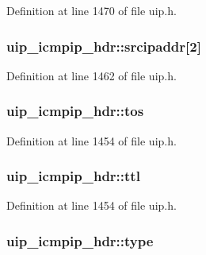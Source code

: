 Definition at line 1470 of file uip.h.

\hypertarget{structuip__icmpip__hdr_a0ec6a6cbcbfd191d393738c16d54e5e1}{
\subsubsection[{srcipaddr}]{ {\bf uip\_\-icmpip\_\-hdr::srcipaddr}\mbox{[}2\mbox{]}}}
\label{structuip__icmpip__hdr_a0ec6a6cbcbfd191d393738c16d54e5e1}


Definition at line 1462 of file uip.h.

\hypertarget{structuip__icmpip__hdr_aa3f2d9cb20290019b2743e8df31a2f8b}{
\subsubsection[{tos}]{ {\bf uip\_\-icmpip\_\-hdr::tos}}}
\label{structuip__icmpip__hdr_aa3f2d9cb20290019b2743e8df31a2f8b}


Definition at line 1454 of file uip.h.

\hypertarget{structuip__icmpip__hdr_a55be3d5413ce49c5c4f5576def12d7ec}{
\subsubsection[{ttl}]{ {\bf uip\_\-icmpip\_\-hdr::ttl}}}
\label{structuip__icmpip__hdr_a55be3d5413ce49c5c4f5576def12d7ec}


Definition at line 1454 of file uip.h.

\hypertarget{structuip__icmpip__hdr_afa0fe6ca88f692d22af70ff007411252}{
\subsubsection[{type}]{ {\bf uip\_\-icmpip\_\-hdr::type}}}
\label{structuip__icmpip__hdr_afa0fe6ca88f692d22af70ff007411252}


